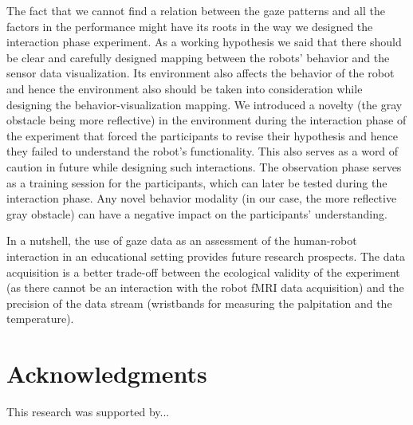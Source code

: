 \documentclass{sig-alternate}
\begin{document}
The fact that we cannot find a relation between the gaze patterns and
all the factors in the performance might have its roots in the way we
designed the interaction phase experiment. As a working hypothesis we
said that there should be clear and carefully designed mapping between
the robots' behavior and the sensor data visualization. Its environment
also affects the behavior of the robot and hence the environment also
should be taken into consideration while designing the
behavior-visualization mapping. We introduced a novelty (the gray
obstacle being more reflective) in the environment during the
interaction phase of the experiment that forced the participants to
revise their hypothesis and hence they failed to understand the robot's
functionality. This also serves as a word of caution in future while
designing such interactions. The observation phase serves as a training
session for the participants, which can later be tested during the
interaction phase. Any novel behavior modality (in our case, the more
reflective gray obstacle) can have a negative impact on the
participants' understanding.

In a nutshell, the use of gaze data as an assessment of the human-robot
interaction in an educational setting provides future research
prospects. The data acquisition is a better trade-off between the
ecological validity of the experiment (as there cannot be an interaction
with the robot fMRI data acquisition) and the precision of the data
stream (wristbands for measuring the palpitation and the temperature).



\section*{Acknowledgments}

This research was supported by...




\balancecolumns
\end{document}
